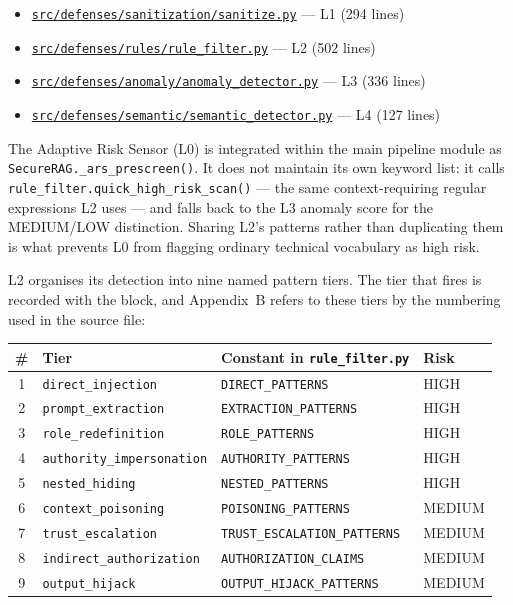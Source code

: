 \begin{itemize}
	\item \href{https://github.com/IbtisamAlghamdi/SecureRAG/blob/main/src/defenses/sanitization/sanitize.py}{\texttt{src/defenses/sanitization/sanitize.py}} --- L1 (294 lines)
	\item \href{https://github.com/IbtisamAlghamdi/SecureRAG/blob/main/src/defenses/rules/rule_filter.py}{\texttt{src/defenses/rules/rule\_filter.py}} --- L2 (502 lines)
	\item \href{https://github.com/IbtisamAlghamdi/SecureRAG/blob/main/src/defenses/anomaly/anomaly_detector.py}{\texttt{src/defenses/anomaly/anomaly\_detector.py}} --- L3 (336 lines)
	\item \href{https://github.com/IbtisamAlghamdi/SecureRAG/blob/main/src/defenses/semantic/semantic_detector.py}{\texttt{src/defenses/semantic/semantic\_detector.py}} --- L4 (127 lines)
\end{itemize}

\noindent
The Adaptive Risk Sensor (L0) is integrated within the main pipeline module as \texttt{SecureRAG.\_ars\_prescreen()}. It does not maintain its own keyword list: it calls \texttt{rule\_filter.quick\_high\_risk\_scan()} --- the same context-requiring regular expressions L2 uses --- and falls back to the L3 anomaly score for the MEDIUM/LOW distinction. Sharing L2's patterns rather than duplicating them is what prevents L0 from flagging ordinary technical vocabulary as high risk.

L2 organises its detection into nine named pattern tiers. The tier that fires is recorded with the block, and Appendix~B refers to these tiers by the numbering used in the source file:

\begin{center}
\begin{tabular}{clll}
\toprule
\textbf{\#} & \textbf{Tier} & \textbf{Constant in \texttt{rule\_filter.py}} & \textbf{Risk} \\
\midrule
1 & \texttt{direct\_injection}        & \texttt{DIRECT\_PATTERNS}            & HIGH \\
2 & \texttt{prompt\_extraction}       & \texttt{EXTRACTION\_PATTERNS}        & HIGH \\
3 & \texttt{role\_redefinition}       & \texttt{ROLE\_PATTERNS}              & HIGH \\
4 & \texttt{authority\_impersonation} & \texttt{AUTHORITY\_PATTERNS}         & HIGH \\
5 & \texttt{nested\_hiding}           & \texttt{NESTED\_PATTERNS}            & HIGH \\
6 & \texttt{context\_poisoning}       & \texttt{POISONING\_PATTERNS}         & MEDIUM \\
7 & \texttt{trust\_escalation}        & \texttt{TRUST\_ESCALATION\_PATTERNS} & MEDIUM \\
8 & \texttt{indirect\_authorization}  & \texttt{AUTHORIZATION\_CLAIMS}       & MEDIUM \\
9 & \texttt{output\_hijack}           & \texttt{OUTPUT\_HIJACK\_PATTERNS}    & MEDIUM \\
\bottomrule
\end{tabular}
\end{center}

